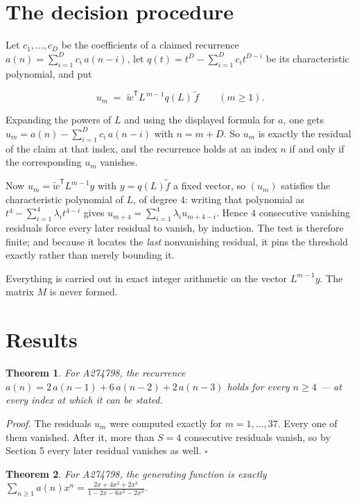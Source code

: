 \documentclass[11pt]{article}
\newtheorem{theorem}{Theorem}
\theoremstyle{definition}
\begin{document}
\section{The decision procedure}

Let $c_1,\dots,c_D$ be the coefficients of a claimed recurrence $a(n) = \sum_{i=1}^{D} c_i\,a(n-i)$, let $q(t) = t^{D} - \sum_{i=1}^{D} c_i t^{D-i}$ be its characteristic polynomial, and put

\[u_m \;=\; \tilde w^{\mathsf T} L^{\,m-1} q(L)\,\tilde f \qquad (m \ge 1).\]

Expanding the powers of $L$ and using the displayed formula for $a$, one gets $u_m = a(n) - \sum_{i=1}^{D} c_i\,a(n-i)$ with $n = m + D$. So $u_m$ is exactly the residual of the claim at that index, and the recurrence holds at an index $n$ if and only if the corresponding $u_m$ vanishes.

Now $u_m = \tilde w^{\mathsf T} L^{m-1} y$ with $y = q(L)\tilde f$ a fixed vector, so $(u_m)$ satisfies the characteristic polynomial of $L$, of degree $4$: writing that polynomial as $t^{4} - \sum_{i=1}^{4} \lambda_i t^{4-i}$ gives $u_{m+4} = \sum_{i=1}^{4} \lambda_i u_{m+4-i}$. Hence $4$ consecutive vanishing residuals force every later residual to vanish, by induction. The test is therefore finite; and because it locates the {\itshape last} nonvanishing residual, it pins the threshold exactly rather than merely bounding it.

Everything is carried out in exact integer arithmetic on the vector $L^{m-1}y$. The matrix $M$ is never formed.

\section{Results}

\begin{theorem} For A274798, the recurrence $a(n) = 2\,a(n-1) + 6\,a(n-2) + 2\,a(n-3)$ holds for every $n \ge 4$ --- at every index at which it can be stated.\end{theorem}

{\itshape Proof.} The residuals $u_m$ were computed exactly for $m = 1,\dots,37$. Every one of them vanished. After it, more than $S = 4$ consecutive residuals vanish, so by Section 5 every later residual vanishes as well. $\square$

\begin{theorem} For A274798, the generating function is exactly $\sum_{n\ge 1} a(n)x^n = \frac{2x + 4x^{2} + 2x^{3}}{1 - 2x - 6x^{2} - 2x^{3}}$.\end{theorem}
\end{document}
